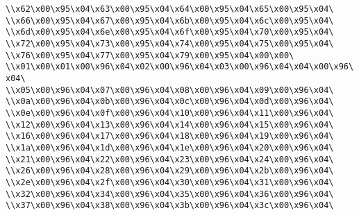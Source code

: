 \verb|\\x62\x00\x95\x04\x63\x00\x95\x04\x64\x00\x95\x04\x65\x00\x95\x04\|\newline
\verb|\\x66\x00\x95\x04\x67\x00\x95\x04\x6b\x00\x95\x04\x6c\x00\x95\x04\|\newline
\verb|\\x6d\x00\x95\x04\x6e\x00\x95\x04\x6f\x00\x95\x04\x70\x00\x95\x04\|\newline
\verb|\\x72\x00\x95\x04\x73\x00\x95\x04\x74\x00\x95\x04\x75\x00\x95\x04\|\newline
\verb|\\x76\x00\x95\x04\x77\x00\x95\x04\x79\x00\x95\x04\x00\x00\|\newline
\verb|\\x01\x00\x01\x00\x96\x04\x02\x00\x96\x04\x03\x00\x96\x04\x04\x00\x96\x04\|\newline
\verb|\\x05\x00\x96\x04\x07\x00\x96\x04\x08\x00\x96\x04\x09\x00\x96\x04\|\newline
\verb|\\x0a\x00\x96\x04\x0b\x00\x96\x04\x0c\x00\x96\x04\x0d\x00\x96\x04\|\newline
\verb|\\x0e\x00\x96\x04\x0f\x00\x96\x04\x10\x00\x96\x04\x11\x00\x96\x04\|\newline
\verb|\\x12\x00\x96\x04\x13\x00\x96\x04\x14\x00\x96\x04\x15\x00\x96\x04\|\newline
\verb|\\x16\x00\x96\x04\x17\x00\x96\x04\x18\x00\x96\x04\x19\x00\x96\x04\|\newline
\verb|\\x1a\x00\x96\x04\x1d\x00\x96\x04\x1e\x00\x96\x04\x20\x00\x96\x04\|\newline
\verb|\\x21\x00\x96\x04\x22\x00\x96\x04\x23\x00\x96\x04\x24\x00\x96\x04\|\newline
\verb|\\x26\x00\x96\x04\x28\x00\x96\x04\x29\x00\x96\x04\x2b\x00\x96\x04\|\newline
\verb|\\x2e\x00\x96\x04\x2f\x00\x96\x04\x30\x00\x96\x04\x31\x00\x96\x04\|\newline
\verb|\\x32\x00\x96\x04\x34\x00\x96\x04\x35\x00\x96\x04\x36\x00\x96\x04\|\newline
\verb|\\x37\x00\x96\x04\x38\x00\x96\x04\x3b\x00\x96\x04\x3c\x00\x96\x04\|\newline

